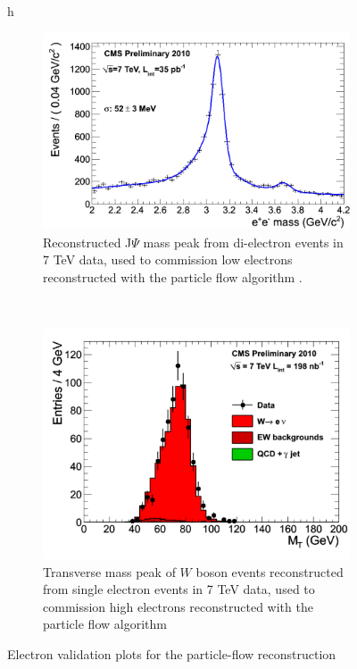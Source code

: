 \begin{figure}{h}
    \centering
    \begin{subfigure}[h]{0.40\textwidth}
        \includegraphics[width=\textwidth]{Figures/Reconstruction_Diagrams/ELE__jpsi_tk_35invpb.png}
        \caption{Reconstructed J$\Psi$ mass peak from di-electron events
          in 7 TeV data, used to commission low \PT electrons reconstructed
        with the particle flow algorithm
        \cite{CMS:Ele_particleFlow_commissioning}. }\label{fig:ele_jpsi_mass}
      \end{subfigure}
      ~ %
    \begin{subfigure}[h]{0.40\textwidth}
        \includegraphics[width=\textwidth]{Figures/Reconstruction_Diagrams/ELE__Welenu_7TeV.pdf}
        \caption{Transverse mass peak of $W$ boson events
          reconstructed from single electron events in 7 TeV data, used to
        commission high \PT electrons reconstructed with the particle flow
      algorithm \cite{CMS:2010zta}}\label{fig:ele_w_mass}
      \end{subfigure}
      \caption{Electron validation plots for the particle-flow reconstruction}\label{fig:ele_pf_validation}
\end{figure}

